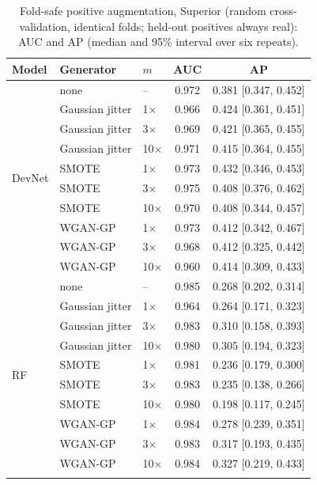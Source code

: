 \documentclass[pdflatex,sn-apa]{sn-jnl}
\begin{document}
\begin{table}[t]
\caption{Fold-safe positive augmentation, Superior (random cross-validation, identical folds; held-out positives always real): AUC and AP (median and 95\% interval over six repeats).}\label{tab:augmentation}
\footnotesize
\begin{tabular*}{0.8\textwidth}{@{\extracolsep\fill}lllcc}
\toprule
Model & Generator & $m$ & AUC & AP \\
\midrule
\multirow{10}{*}{DevNet} & none & -- & 0.972 & 0.381 [0.347, 0.452] \\
 & Gaussian jitter & 1$\times$ & 0.966 & 0.424 [0.361, 0.451] \\
 & Gaussian jitter & 3$\times$ & 0.969 & 0.421 [0.365, 0.455] \\
 & Gaussian jitter & 10$\times$ & 0.971 & 0.415 [0.364, 0.455] \\
 & SMOTE & 1$\times$ & 0.973 & 0.432 [0.346, 0.453] \\
 & SMOTE & 3$\times$ & 0.975 & 0.408 [0.376, 0.462] \\
 & SMOTE & 10$\times$ & 0.970 & 0.408 [0.344, 0.457] \\
 & WGAN-GP & 1$\times$ & 0.973 & 0.412 [0.342, 0.467] \\
 & WGAN-GP & 3$\times$ & 0.968 & 0.412 [0.325, 0.442] \\
 & WGAN-GP & 10$\times$ & 0.960 & 0.414 [0.309, 0.433] \\
\midrule
\multirow{10}{*}{RF} & none & -- & 0.985 & 0.268 [0.202, 0.314] \\
 & Gaussian jitter & 1$\times$ & 0.964 & 0.264 [0.171, 0.323] \\
 & Gaussian jitter & 3$\times$ & 0.983 & 0.310 [0.158, 0.393] \\
 & Gaussian jitter & 10$\times$ & 0.980 & 0.305 [0.194, 0.323] \\
 & SMOTE & 1$\times$ & 0.981 & 0.236 [0.179, 0.300] \\
 & SMOTE & 3$\times$ & 0.983 & 0.235 [0.138, 0.266] \\
 & SMOTE & 10$\times$ & 0.980 & 0.198 [0.117, 0.245] \\
 & WGAN-GP & 1$\times$ & 0.984 & 0.278 [0.239, 0.351] \\
 & WGAN-GP & 3$\times$ & 0.983 & 0.317 [0.193, 0.435] \\
 & WGAN-GP & 10$\times$ & 0.984 & 0.327 [0.219, 0.433] \\
\botrule
\end{tabular*}
\end{table}
\end{document}

